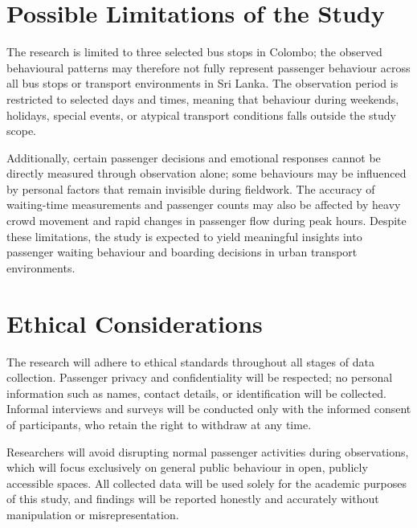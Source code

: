 \documentclass[12pt, a4paper]{report}
\begin{document}
\section{Possible Limitations of the Study}

The research is limited to three selected bus stops in Colombo; the observed behavioural
patterns may therefore not fully represent passenger behaviour across all bus stops or
transport environments in Sri Lanka. The observation period is restricted to selected days
and times, meaning that behaviour during weekends, holidays, special events, or atypical
transport conditions falls outside the study scope.

Additionally, certain passenger decisions and emotional responses cannot be directly
measured through observation alone; some behaviours may be influenced by personal
factors that remain invisible during fieldwork. The accuracy of waiting-time measurements
and passenger counts may also be affected by heavy crowd movement and rapid changes in
passenger flow during peak hours. Despite these limitations, the study is expected to yield
meaningful insights into passenger waiting behaviour and boarding decisions in urban
transport environments.

\section{Ethical Considerations}

The research will adhere to ethical standards throughout all stages of data collection.
Passenger privacy and confidentiality will be respected; no personal information such as
names, contact details, or identification will be collected. Informal interviews and surveys
will be conducted only with the informed consent of participants, who retain the right to
withdraw at any time.

Researchers will avoid disrupting normal passenger activities during observations, which
will focus exclusively on general public behaviour in open, publicly accessible spaces. All
collected data will be used solely for the academic purposes of this study, and findings will
be reported honestly and accurately without manipulation or misrepresentation.
\end{document}

